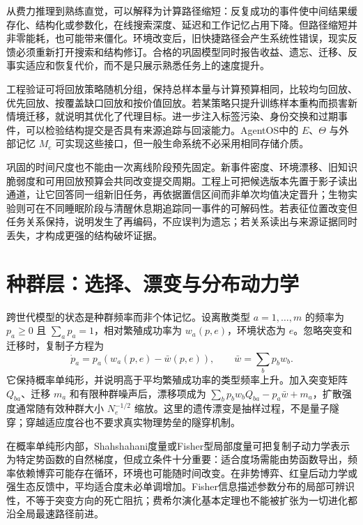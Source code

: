 从费力推理到熟练直觉，可以解释为计算路径缩短：反复成功的事件使中间结果缓存化、结构化或参数化，在线搜索深度、延迟和工作记忆占用下降。但路径缩短并非零能耗，也可能带来僵化。环境改变后，旧快捷路径会产生系统性错误，现实反馈必须重新打开搜索和结构修订。合格的巩固模型同时报告收益、遗忘、迁移、反事实适应和恢复代价，而不是只展示熟悉任务上的速度提升。

工程验证可将回放策略随机分组，保持总样本量与计算预算相同，比较均匀回放、优先回放、按覆盖缺口回放和按价值回放。若某策略只提升训练样本重构而损害新情境迁移，就说明其优化了代理目标。进一步注入标签污染、身份交换和过期事件，可以检验结构提交是否具有来源追踪与回滚能力。AgentOS中的 $E$、$\Theta$ 与外部记忆 $M_e$ 可实现这些接口，但一般生命系统不必采用相同存储介质。

巩固的时间尺度也不能由一次离线阶段预先固定。新事件密度、环境漂移、旧知识脆弱度和可用回放预算会共同改变提交周期。工程上可把候选版本先置于影子读出通道，让它回答同一组新旧任务，再依据置信区间而非单次均值决定晋升；生物实验则可在不同睡眠阶段与清醒休息期追踪同一事件的可解码性。若表征位置改变但任务关系保持，说明发生了再编码，不应误判为遗忘；若关系读出与来源证据同时丢失，才构成更强的结构破坏证据。

\section{种群层：选择、漂变与分布动力学}
\label{sec:population_evolution_information_geometry}

跨世代模型的状态是种群频率而非个体记忆。设离散类型 $a=1,\ldots,m$ 的频率为 $p_a\ge0$ 且 $\sum_a p_a=1$，相对繁殖成功率为 $w_a(p,e)$，环境状态为 $e$。忽略突变和迁移时，复制子方程为
\begin{equation}
 \dot p_a=p_a(w_a(p,e)-\bar w(p,e)),\qquad \bar w=\sum_bp_bw_b.
\end{equation}
它保持概率单纯形，并说明高于平均繁殖成功率的类型频率上升。加入突变矩阵 $Q_{ba}$、迁移 $m_a$ 和有限种群噪声后，漂移项成为 $\sum_bp_bw_bQ_{ba}-p_a\bar w+m_a$，扩散强度通常随有效种群大小 $N_e^{-1/2}$ 缩放。这里的遗传漂变是抽样过程，不是量子隧穿；穿越适应度谷也不要求真实物理势垒的隧穿机制。

在概率单纯形内部，Shahshahani度量或Fisher型局部度量可把复制子动力学表示为特定势函数的自然梯度，但成立条件十分重要：适合度场需能由势函数导出，频率依赖博弈可能存在循环，环境也可能随时间改变。在非势博弈、红皇后动力学或强生态反馈中，平均适合度未必单调增加。Fisher信息描述参数分布的局部可辨识性，不等于突变方向的死亡阻抗；费希尔演化基本定理也不能被扩张为一切进化都沿全局最速路径前进。

